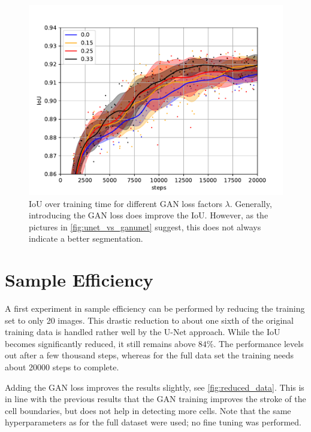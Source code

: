 \documentclass[aps,prl,twocolumn,groupedaddress,amsmath,amssymb]{revtex4-1}
\begin{document}
    \begin{figure}[tbp]
        \begin{center}
        \includegraphics[width=\linewidth]{figures/gan_4_w.pdf}
        \end{center}
        \caption{IoU over training time for different GAN loss factors $\lambda$. Generally, introducing the
        GAN loss does improve the IoU. However, as the pictures in \autoref{fig:unet_vs_ganunet} suggest, 
        this does not always indicate a better segmentation.}
        \label{fig:gan_up}
    \end{figure}


    \section{Sample Efficiency}

    A first experiment in sample efficiency can be performed by reducing the
    training set to only 20 images. This drastic reduction to about one sixth
    of the original training data is handled rather well by the U-Net
    approach. While the IoU becomes significantly reduced, it still remains
    above $84\%$. The performance levels out after a few thousand steps,
    whereas for the full data set the training needs about 20000 steps to
    complete.

    Adding the GAN loss improves the results slightly, see
    \autoref{fig:reduced_data}. This is in line with the previous results that
    the GAN training improves the stroke of the cell boundaries, but does not
    help in detecting more cells.  Note that the same hyperparameters as for
    the full dataset were used; no fine tuning was performed.
\end{document}
